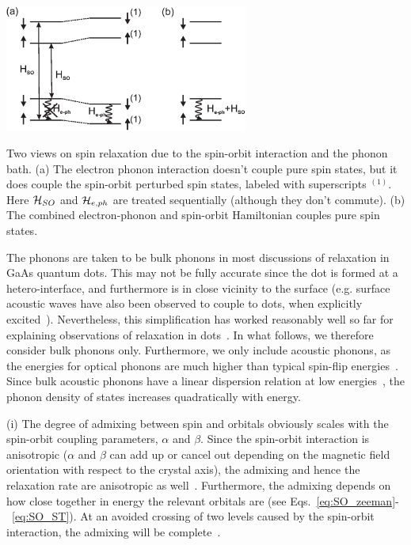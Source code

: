 \documentclass[12pt,aps,nofootinbib]{revtex4-1}
\begin{document}
\bfig
\includegraphics[width=8cm]{hanson_fig20.eps}
\caption{Two views on spin relaxation due to the spin-orbit
interaction and the phonon bath. (a) The electron phonon
interaction doesn't couple pure spin states, but it does couple
the spin-orbit perturbed spin states, labeled with superscripts $^{(1)}$. 
Here ${\cal H}_{SO}$ and ${\cal H}_{e,ph}$ are treated sequentially 
(although they don't commute). (b) The combined
electron-phonon and spin-orbit Hamiltonian couples pure spin
states.} \label{fig:relaxation} \efig

The phonons are taken to be bulk phonons in most discussions of relaxation in GaAs quantum dots. This may not be fully accurate since the dot is formed at a hetero-interface, and furthermore is in close vicinity to the surface (e.g. surface acoustic waves have also been observed to couple to dots, when explicitly excited~\cite{naber06}). Nevertheless, this simplification has worked reasonably well so far for explaining observations of relaxation in dots~\cite{fujisawa98,kroutvar04,amasha06,meunier07}. 
In what follows, we therefore consider bulk phonons only. Furthermore, we only include acoustic phonons, as the energies for optical phonons are much higher than typical spin-flip energies~\cite{ashcroft}. Since bulk acoustic phonons have a linear dispersion relation at low energies~\cite{ashcroft}, the phonon density of states increases quadratically with energy.

(i) The degree of admixing between spin and orbitals obviously scales with the spin-orbit coupling parameters, $\alpha$ and $\beta$. Since the spin-orbit interaction is anisotropic ($\alpha$ and $\beta$ can add up or cancel out depending on the magnetic field orientation with respect to the crystal axis), the admixing and hence the relaxation rate are anisotropic as well~\cite{falko05}. Furthermore, the admixing depends on how close together in energy the relevant orbitals are (see Eqs.~\ref{eq:SO_zeeman}-~\ref{eq:SO_ST}). At an avoided crossing of two levels caused by the spin-orbit interaction, the admixing will be complete~\cite{bulaev05,stano05,stano06}.
\end{document}
